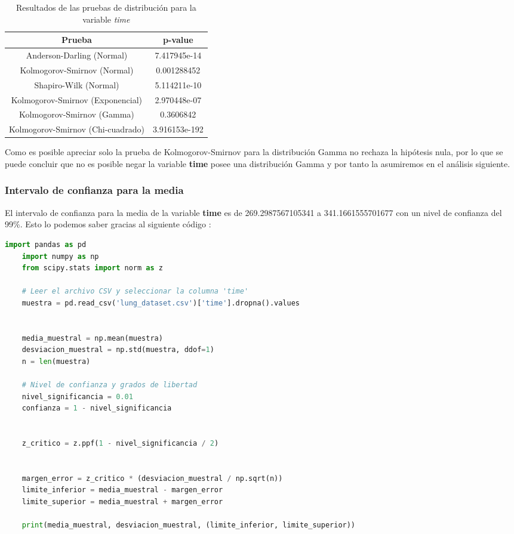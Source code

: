 \documentclass[a4paper,12pt]{article}
\begin{document}
\begin{table}[h!]
    \centering
    \begin{tabular}{|c|c|}
        \hline
        \textbf{Prueba} & \textbf{p-value} \\
        \hline
        Anderson-Darling (Normal) & 7.417945e-14 \\
        \hline
        Kolmogorov-Smirnov (Normal) & 0.001288452 \\
        \hline
        Shapiro-Wilk (Normal) & 5.114211e-10 \\
        \hline
        Kolmogorov-Smirnov (Exponencial) & 2.970448e-07 \\
        \hline
        Kolmogorov-Smirnov (Gamma) & 0.3606842 \\
        \hline
        Kolmogorov-Smirnov (Chi-cuadrado) & 3.916153e-192 \\
        \hline
    \end{tabular}
    \caption{Resultados de las pruebas de distribución para la variable \textit{time}}
    \label{tab:pruebas_distribucion}
\end{table}

Como es posible apreciar solo la prueba de Kolmogorov-Smirnov para la distribución Gamma no rechaza la hipótesis nula, por lo que se puede concluir que no es posible negar la variable \textbf{time} posee una distribución Gamma y por tanto la asumiremos en el análisis siguiente.

\subsubsection*{Intervalo de confianza para la media}

El intervalo de confianza para la media de la variable \textbf{time} es de 269.2987567105341 a 341.1661555701677 con un nivel de confianza del 99\%. Esto lo podemos saber gracias al siguiente código :

\begin{lstlisting}[language=Python, caption={Código en Python para calcular el intervalo de confianza}]
    import pandas as pd
    import numpy as np
    from scipy.stats import norm as z
    
    # Leer el archivo CSV y seleccionar la columna 'time'
    muestra = pd.read_csv('lung_dataset.csv')['time'].dropna().values
    
    
    media_muestral = np.mean(muestra)
    desviacion_muestral = np.std(muestra, ddof=1)
    n = len(muestra)
    
    # Nivel de confianza y grados de libertad
    nivel_significancia = 0.01
    confianza = 1 - nivel_significancia
    

    z_critico = z.ppf(1 - nivel_significancia / 2)
    
    
    margen_error = z_critico * (desviacion_muestral / np.sqrt(n))
    limite_inferior = media_muestral - margen_error
    limite_superior = media_muestral + margen_error
    
    print(media_muestral, desviacion_muestral, (limite_inferior, limite_superior))
    \end{lstlisting}
\end{document}
